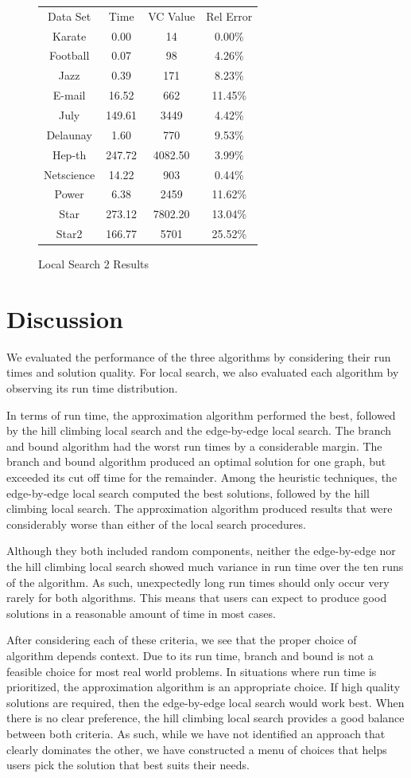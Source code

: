 \documentclass{sig-alternate-05-2015}
\begin{document}
\begin{figure}
\centering
\caption{Local Search 2 Results}
\begin{tabular}{c c c c}
Data Set & Time & VC Value & Rel Error \\
Karate & 0.00 & 14 & 0.00\% \\
Football & 0.07 & 98 & 4.26\% \\
Jazz & 0.39 & 171 & 8.23\% \\
E-mail & 16.52 & 662 & 11.45\% \\
July & 149.61 & 3449 & 4.42\% \\
Delaunay & 1.60 & 770 & 9.53\% \\
Hep-th & 247.72 & 4082.50 & 3.99\% \\
Netscience & 14.22 & 903 & 0.44\% \\
Power & 6.38 & 2459 & 11.62\% \\
Star & 273.12 & 7802.20 & 13.04\% \\
Star2 & 166.77 & 5701 & 25.52\%
\end{tabular}
\end{figure}


\section{Discussion}
We evaluated the performance of the three algorithms by considering their run times and solution quality. For local search, we also evaluated each algorithm by observing its run time distribution. 
\par
In terms of run time, the approximation algorithm performed the best, followed by the hill climbing local search and the edge-by-edge local search. The branch and bound algorithm had the worst run times by a considerable margin. The branch and bound algorithm produced an optimal solution for one graph, but exceeded its cut off time for the remainder. Among the heuristic techniques, the edge-by-edge local search computed the best solutions, followed by the hill climbing local search. The approximation algorithm produced results that were considerably worse than either of the local search procedures.
\par
Although they both included random components, neither the edge-by-edge nor the hill climbing local search showed much variance in run time over the ten runs of the algorithm. As such, unexpectedly long run times should only occur very rarely for both algorithms. This means that users can expect to produce good solutions in a reasonable amount of time in most cases.
\par 
After considering each of these criteria, we see that the proper choice of algorithm depends context. Due to its run time, branch and bound is not a feasible choice for most real world problems. In situations where run time is prioritized, the approximation algorithm is an appropriate choice. If high quality solutions are required, then the edge-by-edge local search would work best. When there is no clear preference, the hill climbing local search provides a good balance between both criteria. As such, while we have not identified an approach that clearly dominates the other, we have constructed a menu of choices that helps users pick the solution that best suits their needs.
\end{document}
